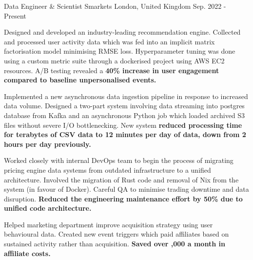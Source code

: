

\begin{cventries}

  \cventry
    {Data Engineer \& Scientist} %
    {Smarkets} %
    {London, United Kingdom} %
    {Sep. 2022 - Present} %
    {
      \begin{cvitems} %
        \item {Designed and developed an industry-leading recommendation engine. Collected and processed user activity data which was fed into an implicit matrix factorisation model minimising RMSE loss. Hyperparameter tuning was done using a custom metric suite through a dockerised project using AWS EC2 resources. A/B testing revealed a \bf{40\% increase in user engagement} compared to baseline unpersonalised events.}
        \item {Implemented a new asynchronous data ingestion pipeline in response to increased data volume. Designed a two-part system involving data streaming into postgres database from Kafka and an asynchronous Python job which loaded archived S3 files without severe I/O bottlenecking. New system \bf{reduced processing time for terabytes of CSV data to 12 minutes} per day of data, down from 2 hours per day previously.}
        \item {Worked closely with internal DevOps team to begin the process of migrating pricing engine data systems from outdated infrastructure to a unified architecture. Involved the migration of Rust code and removal of Nix from the system (in favour of Docker). Careful QA to minimise trading downtime and data disruption. \bf{Reduced the engineering maintenance effort by 50\%} due to unified code architecture.}
        \item {Helped marketing department improve acquisition strategy using user behavioural data. Created new event triggers which paid affiliates based on sustained activity rather than acquisition. \bf{Saved over ,000 a month} in affiliate costs.}
      \end{cvitems}
    }


\end{cventries}
